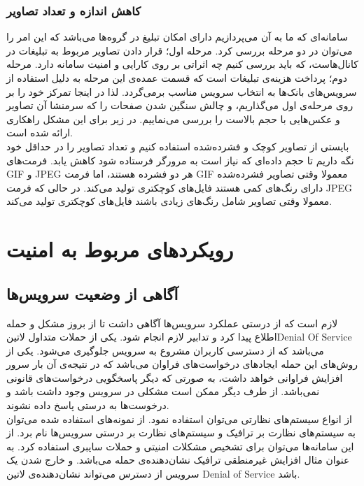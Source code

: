\subsubsection{کاهش اندازه‌ و تعداد تصاویر}
 
 سامانه‌ای که ما به آن می‌پردازیم دارای امکان تبلیغ در گروه‌ها می‌باشد که این امر را می‌توان در دو مرحله بررسی کرد. مرحله اول؛ قرار دادن تصاویر مربوط به تبلیغات در کانال‌هاست، که باید بررسی کنیم چه اثراتی بر روی کارایی و امنیت سامانه دارد. مرحله دوم؛ پرداخت هزینه‌ی تبلیغات است که قسمت عمده‌ی این مرحله به دلیل استفاده از سرویس‌های بانک‌ها به انتخاب سرویس مناسب برمی‌گردد. لذا در اینجا تمرکز خود را بر روی مرحله‌ی اول می‌گذاریم، و چالش سنگین شدن صفحات را که سرمنشا آن تصاویر و عکس‌هایی با حجم بالاست را بررسی می‌نماییم. در زیر برای این مشکل راهکاری ارائه شده است. \\
 بایستی از تصاویر کوچک و فشرده‌شده استفاده کنیم و تعداد تصاویر را در حداقل خود نگه‌‌ داریم تا حجم داده‌ای که نیاز است به مرورگر فرستاده شود کاهش یابد. فرمت‌های GIF و JPEG هر دو فشرده هستند، اما فرمت GIF معمولا وقتی تصاویر فشرده‌شده دارای رنگ‌های کمی هستند فایل‌های کوچکتری تولید می‌کند. در حالی که فرمت  JPEG معمولا وقتی تصاویر شامل رنگ‌های زیادی باشند فایل‌های کوچکتری تولید می‌کند.
 
 \section{رویکردهای مربوط به امنیت}
 \subsection{آگاهی از وضعیت سرویس‌ها}
 لازم است که از درستی عملکرد سرویس‌ها آگاهی داشت تا از بروز مشکل و حمله اطلاع پیدا کرد و تدابیر لازم انجام شود. یکی از حملات متداول ‌لاتین{Denial Of Service } می‌باشد که از دسترسی کاربران مشروع به سرویس جلوگیری می‌شود. یکی از روش‌های این حمله ایجاد‌های درخواست‌های فراوان می‌باشد که در نتیجه‌ی آن بار سرور افزایش فراوانی خواهد داشت، به صورتی که دیگر پاسخگویی درخواست‌های قانونی نمی‌باشد. از طرف دیگر ممکن است مشکلی در سرویس وجود داشت باشد و درخوست‌ها به درستی پاسخ داده نشوند.\\
 از انواع سیستم‌های نظارتی می‌توان استفاده نمود. از نمونه‌های استفاده شده می‌توان به سیستم‌های نظارت بر ترافیک و سیستم‌های نظارت بر درستی سرویس‌ها نام برد. از این سامانه‌ها می‌توان برای تشخیص مشکلات امنیتی و حملات سایبری استفاده کرد. به عنوان مثال افزایش غیر‌منطقی ترافیک نشان‌دهنده‌ی حمله می‌باشد. و خارج شدن یک سرویس از دسترس می‌تواند نشان‌دهنده‌ی ‌لاتین{ Denial of Service  } باشد.
 
